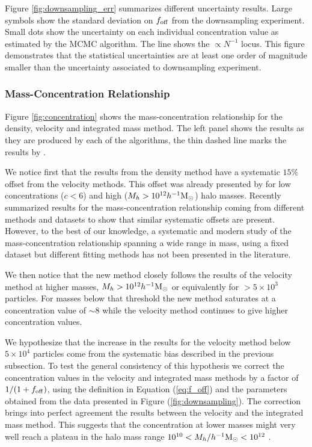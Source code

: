 \documentclass{emulateapj}
\newcommand{\hMsun}{{\ifmmode{h^{-1}{\rm {M_{\odot}}}}\else{$h^{-1}{\rm{M_{\odot}}}$}\fi}}
\begin{document}
Figure \ref{fig:downsampling_err} summarizes different uncertainty
results.  
Large symbols show the standard deviation on $f_{\rm off}$ from the
downsampling experiment.  
Small dots show the uncertainty on each individual concentration value
as estimated by the MCMC algorithm. 
The line shows the $\propto N^{-1}$ locus.  
This figure demonstrates that the statistical uncertainties are at
least one order of magnitude smaller than the uncertainty associated
to downsampling experiment. 


\subsubsection{Mass-Concentration Relationship}


Figure \ref{fig:concentration} shows the mass-concentration
relationship for the density, velocity and integrated mass method.
The left panel shows the results as they are produced by each of the
algorithms, the thin dashed line marks the results by
\citep{Prada2012}.

We notice first that the results from the density method have a
systematic $15\%$offset from the velocity methods.  
This offset was already presented by \citep{Prada2012} for low
concentrations ($c<6$) and high ($M_h>10^{12}\hMsun$) halo masses.  
Recently \citep{Klypin2016} summarized results for the
mass-concentration relationship coming from different methods and
datasets to show that similar systematic offsets are present.
However, to the best of our knowledge, a systematic and modern study of
the mass-concentration relationship spanning a wide range in mass,
using a fixed dataset but different fitting methods has not been
presented in the literature.

We then notice that the new method closely follows the results of
the velocity method at higher masses, $M_h>10^{12}\hMsun$ or
equivalently for $>5\times10^3$ particles.  
For masses below that threshold the new method saturates at a
concentration value of $\sim 8$ while the velocity method continues to
give higher concentration values. 

We hypothesize that the increase in the results for the velocity
method below $5\times 10^{4}$ particles come from the systematic bias
described in the previous subsection.  To test the general consistency
of this hypothesis we correct the concentration values in the
velocity and integrated mass methods by a factor of $1/(1+f_{\rm
  off})$, using the definition in Equation (\ref{eq:f_off}) and the 
parameters obtained from the data presented in Figure
(\ref{fig:downsampling}).  
The correction brings into perfect agreement the results between the
velocity and the integrated mass method.  
This suggests that the concentration at lower masses might very well
reach a plateau in the halo mass range $10^{10}< M_{h}/\hMsun <
10^{12}$ . 
\end{document}
